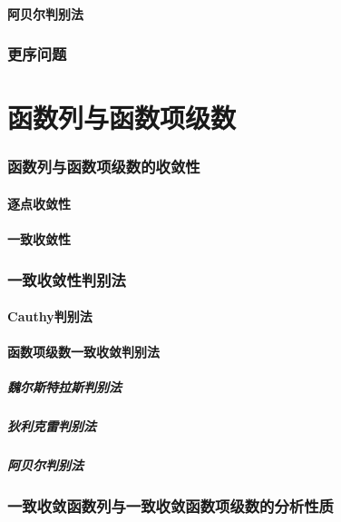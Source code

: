 \documentclass[UTF8]{ctexart}
\begin{document}
    \subsection{阿贝尔判别法}
\section{更序问题}
\part{函数列与函数项级数}
    \section{函数列与函数项级数的收敛性}
        \subsection{逐点收敛性}
        \subsection{一致收敛性}
    \section{一致收敛性判别法}
        \subsection{Cauthy判别法}
        \subsection{函数项级数一致收敛判别法}
            \subsubsection{魏尔斯特拉斯判别法}
            \subsubsection{狄利克雷判别法}
            \subsubsection{阿贝尔判别法}
    \section{一致收敛函数列与一致收敛函数项级数的分析性质}
\end{document}
